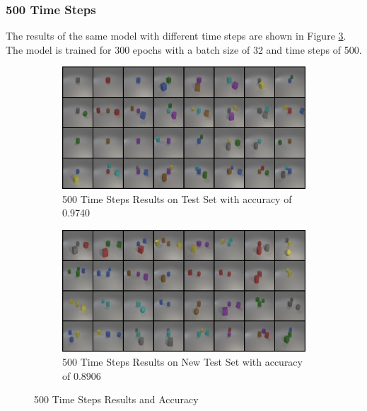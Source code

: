 \subsubsection{500 Time Steps}
The results of the same model with different time steps are shown in Figure \ref{fig:step_500}.
The model is trained for 300 epochs with a batch size of 32 and time steps of 500.
\begin{figure}[H]
    \centering
    \begin{subfigure}{0.48\textwidth}
        \centering
        \includegraphics[width=\textwidth]{figures/step_500_test.png}
        \caption{500 Time Steps Results on Test Set with accuracy of 0.9740}
        \label{fig:step_500_test}
    \end{subfigure}
    \hfill
    \begin{subfigure}{0.48\textwidth}
        \centering
        \includegraphics[width=\textwidth]{figures/step_500_new_test.png}
        \caption{500 Time Steps Results on New Test Set with accuracy of 0.8906}
        \label{fig:step_500_new_test}
    \end{subfigure}
    \caption{500 Time Steps Results and Accuracy}
    \label{fig:step_500}
\end{figure}

